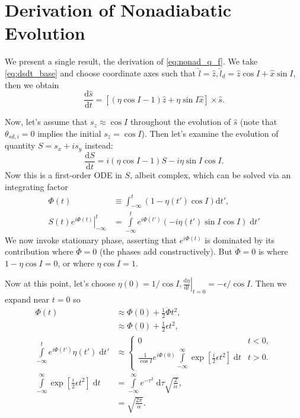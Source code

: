 \documentclass[
        fleqn,
        usenatbib,
    ]{mnras}
\newcommand*{\rd}[2]{\frac{\mathrm{d}#1}{\mathrm{d}#2}}
\newcommand*{\at}[1]{\left.#1\right|}
\newcommand*{\p}[1]{\left(#1\right)}
\newcommand*{\s}[1]{\left[#1\right]}
\begin{document}
\section{Derivation of Nonadiabatic Evolution}\label{s:nonad_app}

We present a single result, the derivation of \autoref{eq:nonad_q_f}. We take
\autoref{eq:dsdt_base} and choose coordinate axes such that $\hat{l} = \hat{z},
\hat{l}_d = \hat{z} \cos I + \hat{x}\sin I$, then we obtain
\begin{equation}
    \rd{\hat{s}}{t} = \s{
        \p{\eta \cos I - 1}\hat{z} + \eta \sin I \hat{x}} \times \hat{s}.
\end{equation}

Now, let's assume that $s_z \approx \cos I$ throughout the evolution of $\hat{s}$
(note that $\theta_{sd, i} = 0$ implies the initial $s_z = \cos I$). Then let's
examine the evolution of quantity $S = s_x + is_y$ instead:
\begin{equation}
    \rd{S}{t} = i\p{\eta\cos I - 1}S - i \eta \sin I\cos I.\label{eq:nonad_ode}
\end{equation}
Now this is a first-order ODE in $S$, albeit complex, which can be solved via
an integrating factor
\begin{align}
    \Phi(t) &\equiv \int_{-\infty}^t \p{1 - \eta(t') \cos I}
        \mathrm{d}t',\\
    \at{S(t) e^{i\Phi(t)}}_{-\infty}^t
        &= \int\limits_{-\infty}^t e^{i\Phi(t')}
            \p{-i\eta(t')\sin I\cos I}\;\mathrm{d}t'\label{eq:nonad_int}
\end{align}
We now invoke stationary phase, asserting that $e^{i\Phi(t)}$ is dominated by
its contribution where $\dot{\Phi} = 0$ (the phases add constructively). But
$\dot{\Phi} = 0$ is where $1 - \eta\cos I = 0$, or where $\eta\cos I = 1$.

Now at this point, let's choose $\eta(0) = 1/\cos I, \at{\rd{\eta}{t}}_{t=0} =
-\epsilon/\cos I$. Then we expand near $t = 0$ so
\begin{align*}
    \Phi(t) &\approx \Phi(0) + \frac{1}{2}\ddot{\Phi}t^2,\\
        &\approx \Phi(0) + \frac{1}{2}\epsilon t^2,\\
    \int\limits_{-\infty}^t e^{i\Phi(t')}\eta(t')\;\mathrm{d}t'
        &\approx
        \begin{cases}
            0 & t < 0,\\
            \frac{1}{\cos I}e^{i\Phi(0)}\int\limits_{-\infty}^\infty
                \exp\s{\frac{i}{2}\epsilon t^2}\;\mathrm{d}t
                & t > 0.
        \end{cases}\\
    \int\limits_{-\infty}^\infty
                \exp\s{\frac{i}{2}\epsilon t^2}\;\mathrm{d}t
        &= \int\limits_{-\infty}^\infty e^{-\tau^2}\;\mathrm{d}\tau
            \sqrt{\frac{2}{i\epsilon}},\\
        &= \sqrt{\frac{2\pi}{i\epsilon}}.
\end{align*}
\end{document}

